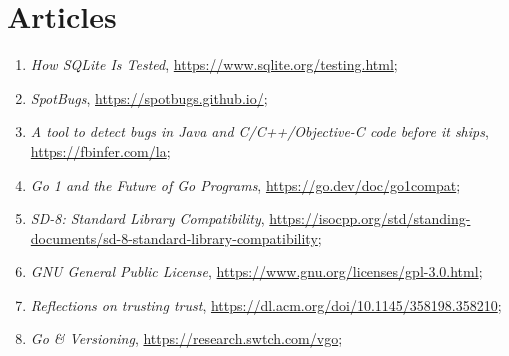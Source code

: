 \documentclass[a4paper,11pt]{article}
\begin{document}
\newpage
\section{Articles}

\vspace{2em}



\begin{enumerate}

\item \textit{How SQLite Is Tested},
  \href{https://www.sqlite.org/testing.html}{https://www.sqlite.org/testing.html};



\item \textit{SpotBugs},
  \href{https://spotbugs.github.io/}{https://spotbugs.github.io/};



\item \textit{A tool to detect bugs in Java and C/C++/Objective-C code
    before it ships},
  \href{https://fbinfer.com/}{https://fbinfer.com/la};



\item \textit{Go 1 and the Future of Go Programs},
  \href{https://go.dev/doc/go1compat}{https://go.dev/doc/go1compat};



\item \textit{SD-8: Standard Library Compatibility},
  \href{https://isocpp.org/std/standing-documents/sd-8-standard-library-compatibility}{https://isocpp.org/std/standing-documents/sd-8-standard-library-compatibility};



\item \textit{GNU General Public License},
  \href{https://www.gnu.org/licenses/gpl-3.0.html}{https://www.gnu.org/licenses/gpl-3.0.html};



\item \textit{Reflections on trusting trust},
  \href{https://dl.acm.org/doi/10.1145/358198.358210}{https://dl.acm.org/doi/10.1145/358198.358210};



\item \textit{Go \& Versioning},
  \href{https://research.swtch.com/vgo}{https://research.swtch.com/vgo};




\end{enumerate}
\end{document}
